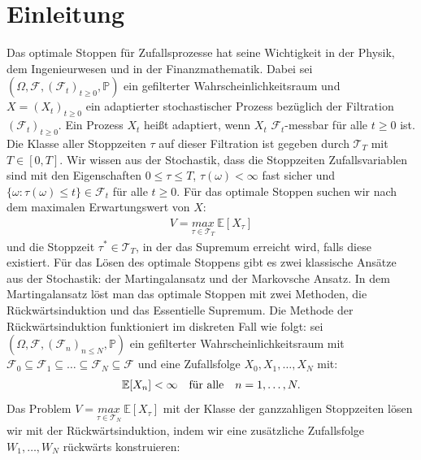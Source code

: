\documentclass[12pt,titlepage,headsepline]{article}
\begin{document}
    \section{Einleitung}
    Das optimale Stoppen \cite{peskir_optimal_2006} für Zufallsprozesse hat seine Wichtigkeit in der Physik, dem Ingenieurwesen und in der Finanzmathematik. Dabei sei $(\Omega,\mathcal{F},(\mathcal{F}_t)_{t\geq 0},\mathbb{P})$ ein gefilterter Wahrscheinlichkeitsraum und $X=(X_t)_{t\geq 0}$ ein adaptierter stochastischer Prozess bezüglich der Filtration $(\mathcal{F}_t)_{t\geq 0}$. Ein Prozess $X_t$ heißt adaptiert, wenn $X_t$ $\mathcal{F}_t$-messbar für alle $t \geq 0 $ ist. Die Klasse aller Stoppzeiten $\tau$ auf dieser Filtration ist gegeben durch
    $\mathcal{T}_T$ mit $T \in [0,T]$. Wir wissen aus der Stochastik, dass die Stoppzeiten Zufallsvariablen sind mit den Eigenschaften
    $0 \leq \tau \leq T$, $\tau(\omega)< \infty$ fast sicher und $\{\omega : \tau(\omega) \leq t\} \in \mathcal{F}_t$ für alle $t\geq 0$.
    \hfill\break
    Für das optimale Stoppen suchen wir nach dem maximalen Erwartungswert von $X$:
    \begin{align*}
      V = \underset{\tau \in \mathcal{T}_T}{max} \ \mathbb{E}[X_{\tau}]
    \end{align*}
    und die Stoppzeit $\tau^* \in \mathcal{T}_T$, in der das Supremum erreicht wird, falls diese existiert.
    \hfill\break
    \hfill\break
    Für das Lösen des optimale Stoppens gibt es zwei klassische Ansätze aus der Stochastik: der Martingalansatz und der Markovsche Ansatz. In dem Martingalansatz löst man das optimale Stoppen mit zwei Methoden, die Rückwärtsinduktion und das Essentielle Supremum. Die Methode der Rückwärtsinduktion funktioniert im diskreten Fall wie folgt: sei $(\Omega,\mathcal{F},(\mathcal{F}_n)_{n \leq N},\mathbb{P})$ ein gefilterter Wahrscheinlichkeitsraum mit $\mathcal{F}_0 \subseteq \mathcal{F}_1 \subseteq \ldots \subseteq \mathcal{F}_N \subseteq \mathcal{F}$ und eine Zufallsfolge $X_0,X_1,\ldots,X_N$ mit:
    \begin{align*}
      \mathbb{E}[X_n] < \infty \quad \textup{für alle} \quad n=1,\ldots,N.
    \end{align*}
    Das Problem $V = \underset{\tau \in \mathcal{T}_N}{max} \ \mathbb{E}[X_{\tau}]$ mit der Klasse der ganzzahligen Stoppzeiten lösen wir mit der Rückwärtsinduktion, indem wir eine zusätzliche Zufallsfolge $W_1,\ldots,W_N$ rückwärts konstruieren:
\end{document}
